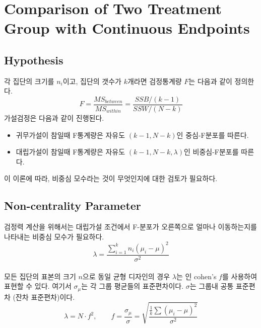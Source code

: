 \section{Comparison of Two Treatment Group with Continuous Endpoints}



\subsection{Hypothesis}
각 집단의 크기를 $n_i$이고, 집단의 갯수가 $k$개라면 검정통계량 $F$는 다음과 같이 정의한다. 
    \begin{equation*}
        F = \frac{MS_{between}}{MS_{within}} = \frac{SSB/(k-1)}{SSW/(N-k)}
    \end{equation*}
가설검정은 다음과 같이 진행된다. 
\begin{itemize}[leftmargin=2.5em]
    \item 귀무가설이 참일때 F통계량은 자유도 $(k-1, N-k)$인 중심-F분포를 따른다. 
    \item 대립가설이 참일때 F통계량은 자유도 $(k-1, N-k, \lambda)$인 비중심-F분포를 따른다. 
\end{itemize}
이 이론에 따라, 비중심 모수라는 것이 무엇인지에 대한 검토가 필요하다. 






\subsection{Non-centrality Parameter}
검정력 계산을 위해서는 대립가설 조건에서 F-분포가 오른쪽으로 얼마나 이동하는지를 나타내는 비중심 모수가 필요하다. 
\\
    \begin{equation*}
        \lambda = \frac{\sum^k_{i=1}n_i(\mu_i-\mu)^2}{\sigma^2}
    \end{equation*}
\\
\noindent
모든 집단의 표본의 크기 $n$으로 동일 균형 디자인의 경우 $\lambda$는 \uline{}인 cohen's $f$를 사용하여 표현할 수 있다. 여기서 $\sigma_\mu$는 각 그룹 평균들의 표준편차이다. $\sigma$는 그룹내 공통 표준편차 (잔차 표준편차)이다. 
\\
    \begin{equation*}
        \lambda = N\cdot f^2, \qquad f = \frac{\sigma_\mu}{\sigma} = \sqrt{\frac{\frac{1}{k}\sum{(\mu_{i}-\mu)^2}}{\sigma^2}}
    \end{equation*}




